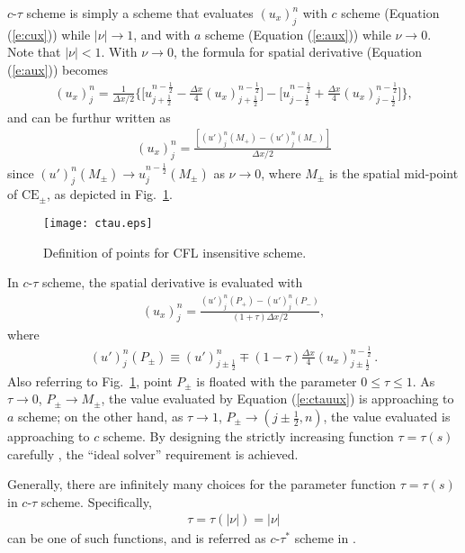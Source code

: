 \documentclass[11pt,dvips]{article}
\renewcommand{\figurename}{Fig.}
\numberwithin{equation}{section}
\begin{document}
$c$-$\tau$ scheme is simply a scheme that evaluates $(u_x)_j^n$ with $c$ scheme
(Equation (\ref{e:cux})) while $|\nu|\rightarrow1$, and with $a$ scheme
(Equation (\ref{e:aux})) while $\nu\rightarrow0$.  Note that $|\nu|<1$.  With
$\nu\rightarrow0$, the formula for spatial derivative (Equation (\ref{e:aux}))
becomes
\begin{align*}
  (u_x)_j^n = \frac{1}{\Delta x/2}\Big\{
      \Big[ u_{j+\frac{1}{2}}^{n-\frac{1}{2}}
         - \frac{\Delta x}{4}(u_x)_{j+\frac{1}{2}}^{n-\frac{1}{2}}
      \Big]
    - \Big[ u_{j-\frac{1}{2}}^{n-\frac{1}{2}}
         + \frac{\Delta x}{4}(u_x)_{j-\frac{1}{2}}^{n-\frac{1}{2}}
      \Big]
  \Big\},
\end{align*}
and can be furthur written as
\begin{align*}
  (u_x)_j^n =
    \frac{\left[(u')_j^n(M_+) - (u')_j^n(M_-)\right]}{\Delta x/2}
\end{align*}
since $(u')_j^n(M_{\pm}) \rightarrow u_j^{n-\frac{1}{2}}(M_{\pm})$ as
$\nu\rightarrow0$, where $M_{\pm}$ is the spatial mid-point of
$\mathrm{CE}_{\pm}$, as depicted in \figurename~\ref{f:ctau}.

\begin{figure}[htbp]
  \centering
  \texttt{[image: ctau.eps]}
  \caption{Definition of points for CFL insensitive scheme.}
  \label{f:ctau}
\end{figure}

In $c$-$\tau$ scheme, the spatial derivative is evaluated with
\begin{align}
  (u_x)_j^n =
    \frac{(u')_j^n(P_+) - (u')_j^n(P_-)}
         {(1+\tau)\Delta x/2}, \label{e:ctauux}
\end{align}
where
\begin{align}
  (u')_j^n(P_{\pm}) \equiv
        (u')_{j\pm\frac{1}{2}}^n
    \mp (1-\tau)\frac{\Delta x}{4}(u_x)_{j\pm\frac{1}{2}}^{n-\frac{1}{2}}
  \,. \label{e:upp}
\end{align}
Also referring to \figurename~\ref{f:ctau}, point $P_{\pm}$ is floated with the
parameter $0\le\tau\le1$.  As $\tau\rightarrow0$, $P_{\pm}\rightarrow M_{\pm}$,
the value evaluated by Equation (\ref{e:ctauux}) is approaching to $a$ scheme;
on the other hand, as $\tau\rightarrow1$,
$P_{\pm}\rightarrow(j\pm\frac{1}{2},n)$, the value evaluated is approaching to
$c$ scheme.  By designing the strictly increasing function $\tau = \tau(s)$
carefully \citep{chang_multi-dimensional_2003}, the ``ideal solver'' requirement
is achieved.

Generally, there are infinitely many choices for the parameter function
$\tau=\tau(s)$ in $c$-$\tau$ scheme.  Specifically,
\begin{align}
  \tau = \tau(|\nu|) = |\nu| \label{e:ctau*}
\end{align}
can be one of such functions, and is referred as $c$-$\tau^*$ scheme in
\cite{chang_courant_2002, chang_multi-dimensional_2003}.
\end{document}

